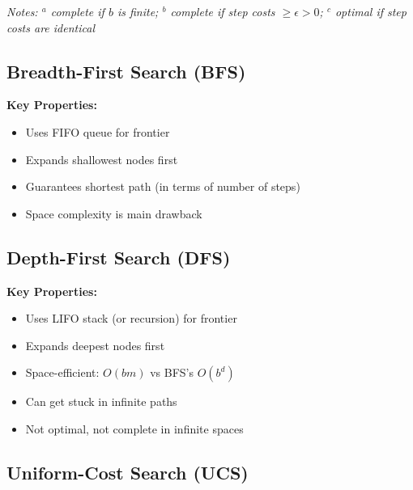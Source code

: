 \documentclass[11pt,letterpaper]{article}
\begin{document}
\textit{Notes: $^a$ complete if $b$ is finite; $^b$ complete if step costs $\geq \epsilon > 0$; $^c$ optimal if step costs are identical}

\subsection{Breadth-First Search (BFS)}

\begin{concept}
\textbf{Key Properties:}
\begin{itemize}
    \item Uses FIFO queue for frontier
    \item Expands shallowest nodes first
    \item Guarantees shortest path (in terms of number of steps)
    \item Space complexity is main drawback
\end{itemize}
\end{concept}

\subsection{Depth-First Search (DFS)}

\begin{concept}
\textbf{Key Properties:}
\begin{itemize}
    \item Uses LIFO stack (or recursion) for frontier
    \item Expands deepest nodes first
    \item Space-efficient: $O(bm)$ vs BFS's $O(b^d)$
    \item Can get stuck in infinite paths
    \item Not optimal, not complete in infinite spaces
\end{itemize}
\end{concept}

\subsection{Uniform-Cost Search (UCS)}
\end{document}

